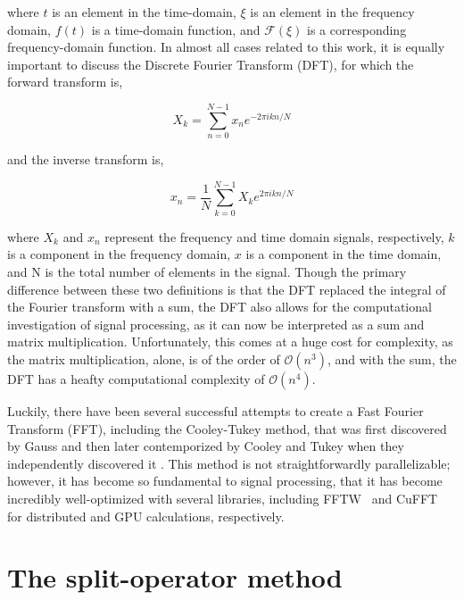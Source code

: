 \noindent where $t$ is an element in the time-domain, $\xi$ is an element in the frequency domain, $f(t)$ is a time-domain function, and $\mathcal{F}(\xi)$ is a corresponding frequency-domain function.
In almost all cases related to this work, it is equally important to discuss the Discrete Fourier Transform (DFT), for which the forward transform is,

$$
X_k = \sum_{n=0}^{N-1} x_n e^{-2 \pi i k n / N}
$$

\noindent and the inverse transform is,

$$
x_n = \frac{1}{N} \sum_{k=0}^{N-1} X_k e^{2 \pi i k n / N}
$$

\noindent where $X_k$ and $x_n$ represent the frequency and time domain signals, respectively, $k$ is a component in the frequency domain, $x$ is a component in the time domain, and N is the total number of elements in the signal.
Though the primary difference between these two definitions is that the DFT replaced the integral of the Fourier transform with a sum, the DFT also allows for the computational investigation of signal processing, as it can now be interpreted as a sum and matrix multiplication.
Unfortunately, this comes at a huge cost for complexity, as the matrix multiplication, alone, is of the order of $\mathcal{O}(n^3)$, and with the sum, the DFT has a heafty computational complexity of $\mathcal{O}(n^4)$.

Luckily, there have been several successful attempts to create a Fast Fourier Transform (FFT), including the Cooley-Tukey method, that was first discovered by Gauss and then later contemporized by Cooley and Tukey when they independently discovered it \cite{cooley1965}.
This method is not straightforwardly parallelizable; however, it has become so fundamental to signal processing, that it has become incredibly well-optimized with several libraries, including FFTW~\cite{frigo1998} and CuFFT~\cite{fatica2008} for distributed and GPU calculations, respectively.


\section{The split-operator method}

